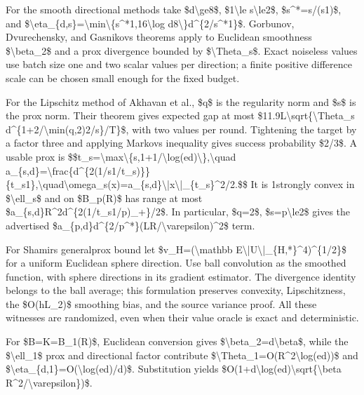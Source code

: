 \documentclass[10pt,a4paper]{article}
\begin{document}
For the smooth directional methods take \$d\textbackslash{}ge8\$, \$1\textbackslash{}le s\textbackslash{}le2\$, \$s\textasciicircum{}*=s/(s1)\$, and \$\textbackslash{}eta\_\{d,s\}=\textbackslash{}min\textbackslash{}\{s\textasciicircum{}*1,16\textbackslash{}log d8\textbackslash{}\}d\textasciicircum{}\{2/s\textasciicircum{}*1\}\$. Gorbunov, Dvurechensky, and Gasnikovs theorems apply to Euclidean smoothness \$\textbackslash{}beta\_2\$ and a prox divergence bounded by \$\textbackslash{}Theta\_s\$. Exact noiseless values use batch size one and two scalar values per direction; a finite positive difference scale can be chosen small enough for the fixed budget.

For the Lipschitz method of Akhavan et al., \$q\$ is the regularity norm and \$s\$ is the prox norm. Their theorem gives expected gap at most \$11.9L\textbackslash{}sqrt\{\textbackslash{}Theta\_s d\textasciicircum{}\{1+2/\textbackslash{}min(q,2)2/s\}/T\}\$, with two values per round. Tightening the target by a factor three and applying Markovs inequality gives success probability \$2/3\$. A usable prox is
\$\$t\_s=\textbackslash{}max\textbackslash{}\{s,1+1/\textbackslash{}log(ed)\textbackslash{}\},\textbackslash{}quad a\_\{s,d\}=\textbackslash{}frac\{d\textasciicircum{}\{2(1/s1\allowbreak{}/t\_s)\}\}\{t\_s1\},\textbackslash{}quad\textbackslash{}ome\allowbreak{}ga\_s(x)=a\_\{s,d\}\textbackslash{}|x\textbackslash{}|\_\{t\_\allowbreak{}s\}\textasciicircum{}2/2.\$\$
It is 1strongly convex in \$\textbackslash{}ell\_s\$ and on \$B\_p(R)\$ has range at most \$a\_\{s,d\}R\textasciicircum{}2d\textasciicircum{}\{2(1/t\_s1/p)\_+\}/2\$. In particular, \$q=2\$, \$s=p\textbackslash{}le2\$ gives the advertised \$a\_\{p,d\}d\textasciicircum{}\{2/p\textasciicircum{}*\}(LR/\textbackslash{}varepsilon)\textasciicircum{}2\$ term.

For Shamirs generalprox bound let \$v\_H=(\textbackslash{}mathbb E\textbackslash{}|U\textbackslash{}|\_\{H,*\}\textasciicircum{}4)\textasciicircum{}\{1/2\}\$ for a uniform Euclidean sphere direction. Use ball convolution as the smoothed function, with sphere directions in its gradient estimator. The divergence identity belongs to the ball average; this formulation preserves convexity, Lipschitzness, the \$O(hL\_2)\$ smoothing bias, and the source variance proof. All these witnesses are randomized, even when their value oracle is exact and deterministic.

For \$B=K=B\_1(R)\$, Euclidean conversion gives \$\textbackslash{}beta\_2=d\textbackslash{}beta\$, while the \$\textbackslash{}ell\_1\$ prox and directional factor contribute \$\textbackslash{}Theta\_1=O(R\textasciicircum{}2\textbackslash{}log(ed))\$ and \$\textbackslash{}eta\_\{d,1\}=O(\textbackslash{}log(ed)/d)\$. Substitution yields \$O(1+d\textbackslash{}log(ed)\textbackslash{}sqrt\{\textbackslash{}beta R\textasciicircum{}2/\textbackslash{}varepsilon\})\$.
\end{document}
